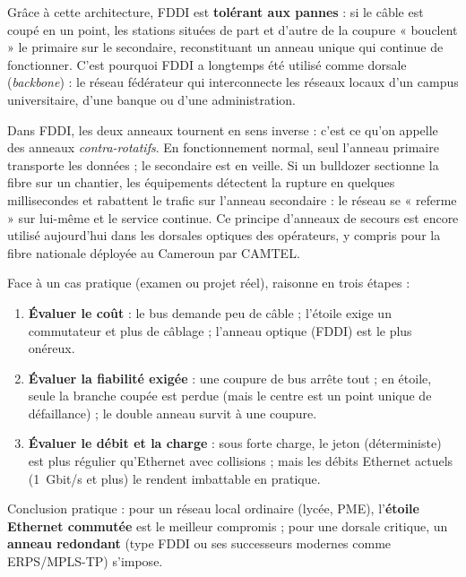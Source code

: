 \documentclass[11pt]{article}
\newcommand{\cle}[1]{{\popxbold\color{popdark}#1}}
\begin{document}
Grâce à cette architecture, FDDI est \textbf{tolérant aux pannes} : si le câble est coupé en un point, les stations situées de part et d'autre de la coupure « bouclent » le primaire sur le secondaire, reconstituant un anneau unique qui continue de fonctionner. C'est pourquoi FDDI a longtemps été utilisé comme \cle{dorsale} (\emph{backbone}) : le réseau fédérateur qui interconnecte les réseaux locaux d'un campus universitaire, d'une banque ou d'une administration.

\begin{savaistu}
Dans FDDI, les deux anneaux tournent en sens inverse : c'est ce qu'on appelle des anneaux \emph{contra-rotatifs}. En fonctionnement normal, seul l'anneau primaire transporte les données ; le secondaire est en veille. Si un bulldozer sectionne la fibre sur un chantier, les équipements détectent la rupture en quelques millisecondes et rabattent le trafic sur l'anneau secondaire : le réseau se « referme » sur lui-même et le service continue. Ce principe d'anneaux de secours est encore utilisé aujourd'hui dans les dorsales optiques des opérateurs, y compris pour la fibre nationale déployée au Cameroun par CAMTEL.
\end{savaistu}

\begin{methode}
Face à un cas pratique (examen ou projet réel), raisonne en trois étapes :
\begin{enumerate}
\item \textbf{Évaluer le coût} : le bus demande peu de câble ; l'étoile exige un commutateur et plus de câblage ; l'anneau optique (FDDI) est le plus onéreux.
\item \textbf{Évaluer la fiabilité exigée} : une coupure de bus arrête tout ; en étoile, seule la branche coupée est perdue (mais le centre est un point unique de défaillance) ; le double anneau survit à une coupure.
\item \textbf{Évaluer le débit et la charge} : sous forte charge, le jeton (déterministe) est plus régulier qu'Ethernet avec collisions ; mais les débits Ethernet actuels (\SI{1}{Gbit/s} et plus) le rendent imbattable en pratique.
\end{enumerate}
Conclusion pratique : pour un réseau local ordinaire (lycée, PME), l'\textbf{étoile Ethernet commutée} est le meilleur compromis ; pour une dorsale critique, un \textbf{anneau redondant} (type FDDI ou ses successeurs modernes comme ERPS/MPLS-TP) s'impose.
\end{methode}
\end{document}

